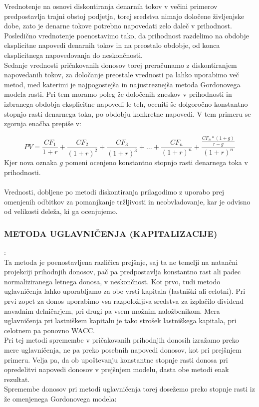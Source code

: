 \documentclass[12pt,a4paper]{amsart}
\theoremstyle{definition} %
\theoremstyle{plain} %
\begin{document}
Vrednotenje na osnovi diskontiranja denarnih tokov v večini primerov predpostavlja trajni obstoj podjetja, torej sredstva nimajo določene življenjske dobe, zato je denarne tokove potrebno napovedati zelo daleč v prihodnost. Posledično vrednotenje poenostavimo tako, da prihodnost razdelimo na obdobje eksplicitne napovedi denarnih tokov in na preostalo obdobje, od konca eksplicitnega napovedovanja do neskončnosti. \\
Sedanje vrednosti pričakovanih donosov torej preračunamo z diskontiranjem napovedanih tokov, za določanje preostale vrednosti pa lahko uporabimo več metod, med katerimi je najpogostejša in najustreznejša metoda Gordonovega modela rasti. Pri tem moramo poleg že določenih zneskov v prihodnosti in izbranega obdobja eksplicitne napovedi le teh, oceniti še dolgoročno konstantno stopnjo rasti denarnega toka, po obdobju konkretne napovedi. V tem primeru se zgornja enačba prepiše v:

\begin{equation}
PV=\frac{CF_1}{1+r}+\frac{CF_2}{(1+r)^2}+\frac{CF_3}{(1+r)^3}+\ldots+\frac{CF_n}{(1+r)^n}+\frac{\frac{CF_n*(1+g)}{r-g}}{(1+r)^n}
\end{equation}
Kjer nova oznaka $g$ pomeni ocenjeno konstantno stopnjo rasti denarnega toka v prihodnosti.\\
\\
Vrednosti, dobljene po metodi diskontiranja prilagodimo z uporabo prej omenjenih odbitkov za pomanjkanje tržljivosti in neobvladovanje, kar je odvisno od velikosti deleža, ki ga ocenjujemo.


\subsubsection{METODA UGLAVNIČENJA (KAPITALIZACIJE)}:\\

Ta metoda je poenostavljena različica prejšnje, saj ta ne temelji na natančni projekciji prihodnjih donosov, pač pa predpostavlja konstantno rast ali padec normaliziranega letnega donosa, v neskončnost. Kot prvo, tudi metodo uglavničenja lahko uporabljamo za obe vrsti kapitala (lastniški ali celotni). Pri prvi zopet za donos uporabimo vsa razpoložljiva sredstva za izplačilo dividend navadnim delničarjem, pri drugi pa vsem možnim naložbenikom. Mera uglavničenja pri lastniškem kapitalu je tako strošek lastniškega kapitala, pri celotnem pa ponovno WACC.\\
Pri tej metodi spremembe v pričakovanih prihodnjih donosih izražamo preko mere uglavničenja, ne pa preko posebnih napovedi donosov, kot pri prejšnjem primeru. Velja pa, da ob upoštevanju konstantne stopnje rasti donosa pri opredelitvi napovedi donosov v prejšnjem modelu, dasta obe metodi enak rezultat.\\
Spremembe donosov pri metodi uglavničenja torej dosežemo preko stopnje rasti iz že omenjenega Gordonovega modela:
\end{document}
